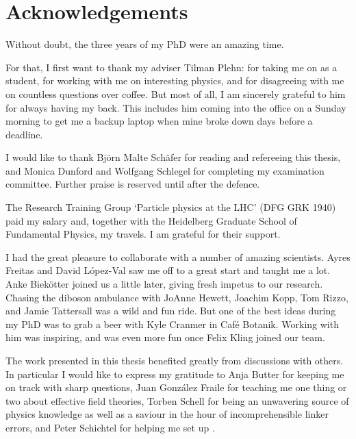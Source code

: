 
\chapter*{Acknowledgements}

Without doubt, the three years of my PhD were an amazing time. 

For that, I first want to thank my adviser Tilman Plehn: for taking me
on as a student, for working with me on interesting physics, and for
disagreeing with me on countless questions over coffee. But most of
all, I am sincerely grateful to him for always having my back. This
includes him coming into the office on a Sunday morning to get me a
backup laptop when mine broke down days before a deadline.
%
%
%

I would like to thank Bj\"orn Malte Sch\"afer for reading and
refereeing this thesis, and Monica Dunford and Wolfgang Schlegel for
completing my examination committee. Further praise is reserved until
after the defence.

The Research Training Group `Particle physics at the LHC' (DFG GRK
1940) paid my salary and, together with the Heidelberg Graduate School
of Fundamental Physics, my travels. I am grateful for their support.

I had the great pleasure to collaborate with a number of amazing
scientists. Ayres Freitas and David L\'opez-Val saw me off to a great
start and taught me a lot. Anke Biek\"otter joined us a little later,
giving fresh impetus to our research. Chasing the diboson ambulance
with JoAnne Hewett, Joachim Kopp, Tom Rizzo, and Jamie Tattersall was
a wild and fun ride. But one of the best ideas during my PhD was to
grab a beer with Kyle Cranmer in Caf\'e Botanik. Working with him was
inspiring, and was even more fun once Felix Kling joined our team.

The work presented in this thesis benefited greatly from discussions
with others. In particular I would like to express my gratitude to
Anja Butter for keeping me on track with sharp questions, Juan
Gonz\'alez Fraile for teaching me one thing or two about effective
field theories, Torben Schell for being an unwavering source of physics
knowledge as well as a saviour in the hour of incomprehensible linker
errors, and Peter Schichtel for helping me set up
.

